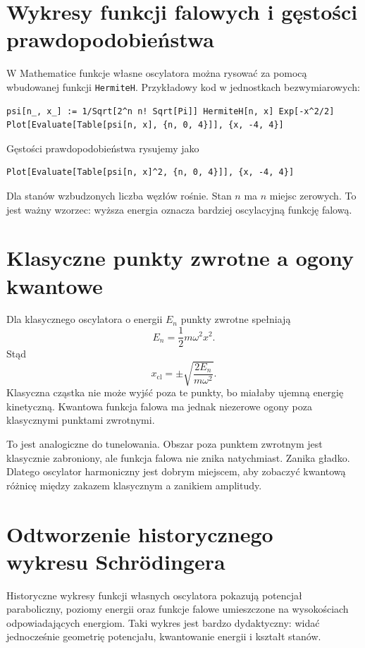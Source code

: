 \section{Wykresy funkcji falowych i gęstości prawdopodobieństwa}

W Mathematice funkcje własne oscylatora można rysować za pomocą wbudowanej funkcji \texttt{HermiteH}. Przykładowy kod w jednostkach bezwymiarowych:
\begin{verbatim}
psi[n_, x_] := 1/Sqrt[2^n n! Sqrt[Pi]] HermiteH[n, x] Exp[-x^2/2]
Plot[Evaluate[Table[psi[n, x], {n, 0, 4}]], {x, -4, 4}]
\end{verbatim}
Gęstości prawdopodobieństwa rysujemy jako
\begin{verbatim}
Plot[Evaluate[Table[psi[n, x]^2, {n, 0, 4}]], {x, -4, 4}]
\end{verbatim}

Dla stanów wzbudzonych liczba węzłów rośnie. Stan \(n\) ma \(n\) miejsc zerowych. To jest ważny wzorzec: wyższa energia oznacza bardziej oscylacyjną funkcję falową.

\section{Klasyczne punkty zwrotne a ogony kwantowe}

Dla klasycznego oscylatora o energii \(E_n\) punkty zwrotne spełniają
\begin{equation}
    E_n=\frac{1}{2}m\omega^2x^2.
\end{equation}
Stąd
\begin{equation}
    x_{\mathrm{cl}}=\pm\sqrt{\frac{2E_n}{m\omega^2}}.
\end{equation}
Klasyczna cząstka nie może wyjść poza te punkty, bo miałaby ujemną energię kinetyczną. Kwantowa funkcja falowa ma jednak niezerowe ogony poza klasycznymi punktami zwrotnymi.

To jest analogiczne do tunelowania. Obszar poza punktem zwrotnym jest klasycznie zabroniony, ale funkcja falowa nie znika natychmiast. Zanika gładko. Dlatego oscylator harmoniczny jest dobrym miejscem, aby zobaczyć kwantową różnicę między zakazem klasycznym a zanikiem amplitudy.

\section{Odtworzenie historycznego wykresu Schrödingera}

Historyczne wykresy funkcji własnych oscylatora pokazują potencjał paraboliczny, poziomy energii oraz funkcje falowe umieszczone na wysokościach odpowiadających energiom. Taki wykres jest bardzo dydaktyczny: widać jednocześnie geometrię potencjału, kwantowanie energii i kształt stanów.

